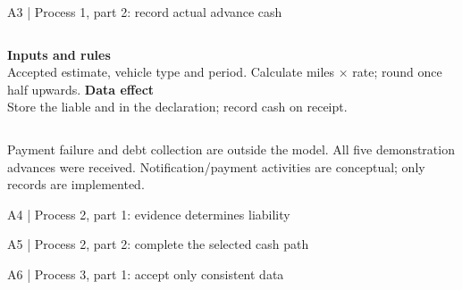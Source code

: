 \begin{frame}{A3 | Process 1, part 2: record actual advance cash}
\small
\begin{center}\end{center}
\begin{columns}[T,onlytextwidth]
\textbf{Inputs and rules}\\Accepted estimate, vehicle type and period. Calculate miles × rate; round once half upwards.
\textbf{Data effect}\\Store the liable  and  in the declaration; record  cash on receipt.
\end{columns}
\medskip
{\small Payment failure and debt collection are outside the model. All five demonstration advances were received. Notification/payment activities are conceptual; only records are implemented.}
\epclegend
{}
\end{frame}

\begin{frame}{A4 | Process 2, part 1: evidence determines liability}
\begin{center}\end{center}
\epclegend
{}
\end{frame}

\begin{frame}{A5 | Process 2, part 2: complete the selected cash path}
\begin{center}\end{center}
\epclegend
{}
\end{frame}

\begin{frame}{A6 | Process 3, part 1: accept only consistent data}
\begin{center}\end{center}
\epclegend
{}
\end{frame}

